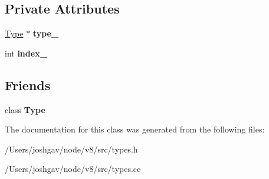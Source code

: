 \subsection*{Private Attributes}
\begin{DoxyCompactItemize}
\item 
\hyperlink{classv8_1_1internal_1_1_type}{Type} $\ast$ {\bfseries type\+\_\+}\hypertarget{classv8_1_1internal_1_1_type_1_1_iterator_a900d375596b8db3061ac5feb4dd9e65c}{}\label{classv8_1_1internal_1_1_type_1_1_iterator_a900d375596b8db3061ac5feb4dd9e65c}

\item 
int {\bfseries index\+\_\+}\hypertarget{classv8_1_1internal_1_1_type_1_1_iterator_a650152972f8223fa44c16fdafcf82453}{}\label{classv8_1_1internal_1_1_type_1_1_iterator_a650152972f8223fa44c16fdafcf82453}

\end{DoxyCompactItemize}
\subsection*{Friends}
\begin{DoxyCompactItemize}
\item 
class {\bfseries Type}\hypertarget{classv8_1_1internal_1_1_type_1_1_iterator_a18dba29b4f3e91d6d2bc53472a6bb7cc}{}\label{classv8_1_1internal_1_1_type_1_1_iterator_a18dba29b4f3e91d6d2bc53472a6bb7cc}

\end{DoxyCompactItemize}


The documentation for this class was generated from the following files\+:\begin{DoxyCompactItemize}
\item 
/\+Users/joshgav/node/v8/src/types.\+h\item 
/\+Users/joshgav/node/v8/src/types.\+cc\end{DoxyCompactItemize}
